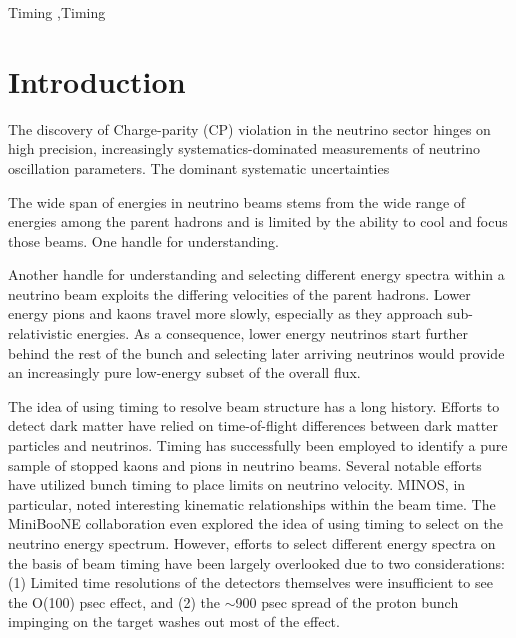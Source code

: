 \documentclass[preprint,12pt]{elsarticle}
\begin{document}
\begin{frontmatter}
\begin{abstract}
\end{abstract}



\begin{keyword}
Timing \sep Timing


\end{keyword}

\end{frontmatter}

\linenumbers

\section{Introduction}
\label{sec:intro}

The discovery of Charge-parity (CP) violation in the neutrino sector hinges on high precision, increasingly systematics-dominated measurements of neutrino oscillation parameters. The dominant systematic uncertainties

The wide span of energies in neutrino beams stems from the wide range of energies among the parent hadrons and is limited by the ability to cool and focus those beams. One handle for understanding.

Another handle for understanding and selecting different energy spectra within a neutrino beam exploits the differing velocities of the parent hadrons. Lower energy pions and kaons travel more slowly, especially as they approach sub-relativistic energies. As a consequence, lower energy neutrinos start further behind the rest of the bunch and selecting later arriving neutrinos would provide an increasingly pure low-energy subset of the overall flux.

The idea of using timing to resolve beam structure has a long history. Efforts to detect dark matter have relied on time-of-flight differences between dark matter particles and neutrinos. Timing has successfully been employed to identify a pure sample of stopped kaons and pions in neutrino beams. Several notable efforts have utilized bunch timing to place limits on neutrino velocity. MINOS, in particular, noted interesting kinematic relationships within the beam time. The MiniBooNE collaboration even explored the idea of using timing to select on the neutrino energy spectrum. However, efforts to select different energy spectra on the basis of beam timing have been largely overlooked due to two considerations: (1) Limited time resolutions of the detectors themselves were insufficient to see the O(100) psec effect, and (2) the $\sim$900 psec spread of the proton bunch impinging on the target washes out most of the effect.
\end{document}
